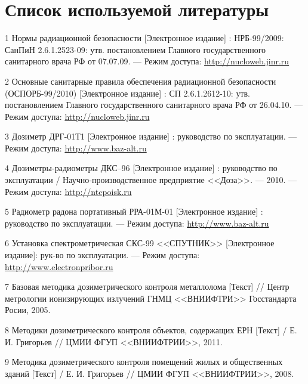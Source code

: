 \chapter{Список используемой литературы}
    1 Нормы радиационной безопасности [Электронное издание] : 
        НРБ-99/2009: СанПиН 2.6.1.2523-09: утв. постановлением 
        Главного государственного санитарного врача РФ 
        от 07.07.09. --- Режим доступа: 
        \href{http://nucloweb.jinr.ru/nucloserv/inform/instructions/nrb-99-2009.pdf}
        {http://nucloweb.jinr.ru}

    2 Основные санитарные правила обеспечения радиационной безопасности
         (ОСПОРБ-99/2010) [Электронное издание] : СП 2.6.1.2612-10: утв. 
        постановлением Главного государственного санитарного врача РФ 
        от 26.04.10. --- Режим доступа: 
        \href{http://nucloweb.jinr.ru/nucloserv/inform/instructions/osprb-99-2010.pdf}
        {http://nucloweb.jinr.ru}

    3 Дозиметр ДРГ-01Т1 [Электронное издание] : руководство по 
        эксплуатации. --- Режим доступа: 
        \href{http://www.baz-alt.ru/userfiles/files/sks.pdf}
        {http://www.baz-alt.ru}

    4 Дозиметры-радиометры ДКС–96 [Электронное издание] : руководство по 
        эксплуатации / Научно-производственное предприятие <<Доза>>. --- 
        2010. --- Режим доступа: 
        \href{http://ntcpoisk.ru/d/350762/d/dozimetri_radiometridks96.pdf}
        {http://ntcpoisk.ru}  

    5 Радиометр радона портативный РРА-01М-01 [Электронное издание] : 
        руководство по эксплуатации. --- Режим доступа: 
        \href{http://www.baz-alt.ru/userfiles/files/sks.pdf}
        {http://www.baz-alt.ru}  

    6 Установка спектрометрическая СКС-99 <<СПУТНИК>> [Электронное издание]: 
        рук-во по эксплуатации. --- Режим доступа: 
        \href{http://www.electronpribor.ru/resources/docs/RE_PPA_01_01ispr.pdf}
        {http://www.electronpribor.ru}

    7 Базовая методика дозиметрического контроля металлолома [Текст] // 
        Центр метрологии ионизирующих излучений ГНМЦ <<ВНИИФТРИ>> 
        Госстандарта Росии, 2005.
    
    8 Методики дозиметрического контроля объектов, содержащих ЕРН [Текст] / 
        Е. И. Григорьев // ЦМИИ ФГУП <<ВНИИФТРИИ>>, 2011. 

    9 Методика дозиметрического контроля помещений жилых и общественных 
        зданий [Текст] / Е. И. Григорьев // ЦМИИ ФГУП <<ВНИИФТРИИ>>, 2008.

